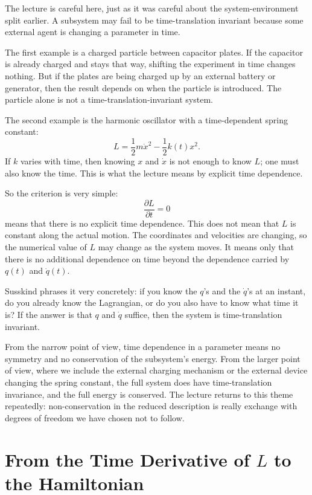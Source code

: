 The lecture is careful here, just as it was careful about the system-environment split earlier. A subsystem may fail to be time-translation invariant because some external agent is changing a parameter in time.

The first example is a charged particle between capacitor plates. If the capacitor is already charged and stays that way, shifting the experiment in time changes nothing. But if the plates are being charged up by an external battery or generator, then the result depends on when the particle is introduced. The particle alone is not a time-translation-invariant system.

The second example is the harmonic oscillator with a time-dependent spring constant:
\begin{equation}
L=\frac12 m\dot x^2-\frac12 k(t)x^2.
\end{equation}
If \(k\) varies with time, then knowing \(x\) and \(\dot x\) is not enough to know \(L\); one must also know the time. This is what the lecture means by explicit time dependence.

So the criterion is very simple:
\begin{equation}
\frac{\partial L}{\partial t}=0
\end{equation}
means that there is no explicit time dependence. This does not mean that \(L\) is constant along the actual motion. The coordinates and velocities are changing, so the numerical value of \(L\) may change as the system moves. It means only that there is no additional dependence on time beyond the dependence carried by \(q(t)\) and \(\dot q(t)\).

Susskind phrases it very concretely: if you know the \(q\)'s and the \(\dot q\)'s at an instant, do you already know the Lagrangian, or do you also have to know what time it is? If the answer is that \(q\) and \(\dot q\) suffice, then the system is time-translation invariant.

From the narrow point of view, time dependence in a parameter means no symmetry and no conservation of the subsystem's energy. From the larger point of view, where we include the external charging mechanism or the external device changing the spring constant, the full system does have time-translation invariance, and the full energy is conserved. The lecture returns to this theme repeatedly: non-conservation in the reduced description is really exchange with degrees of freedom we have chosen not to follow.

\section{From the Time Derivative of \(L\) to the Hamiltonian}

